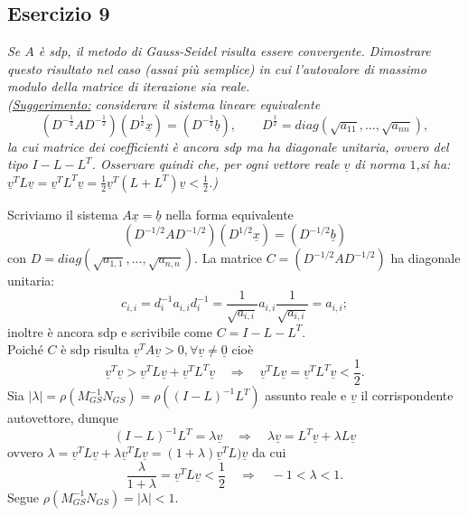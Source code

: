 \subsection{Esercizio 9}
\label{sub:es9}
\emph{Se $A$ è \textit{sdp}, il metodo di Gauss-Seidel risulta essere convergente.
      Dimostrare questo risultato nel caso (assai più semplice) in cui l'autovalore di massimo modulo della matrice di iterazione sia reale.\\
			(\underline{Suggerimento:} considerare il sistema lineare equivalente
			$$(D^{-\frac{1}{2}}AD^{-\frac{1}{2}})(D^{\frac{1}{2}}\underline{x})=(D^{-\frac{1}{2}}\underline{b}),\qquad D^{\frac{1}{2}}=diag(\sqrt{a_{11}},\dots,\sqrt{a_{nn}}),$$
			la cui matrice dei coefficienti è ancora \textit{sdp} ma ha diagonale unitaria,
      ovvero del tipo $I-L-L^T$. Osservare quindi che, per ogni vettore reale $\underline{v}$ di norma $1$,si ha:
      $\underline{v}^TL\underline{v}=\underline{v}^TL^T\underline{v}=\frac{1}{2}\underline{v}^T(L+L^T)\underline{v}<\frac{1}{2}$.)}
\begin{sol}
  Scriviamo il sistema $A\underline{x}=\underline{b}$ nella forma equivalente
  $$\left(D^{-1/2}AD^{-1/2}\right)\left(D^{1/2}\underline{x}\right)=\left(D^{-1/2}\underline{b}\right)$$
  con $D=diag(\sqrt{a_{1,1}},\ldots,\sqrt{a_{n,n}})$.
  La matrice $C=\left(D^{-1/2}AD^{-1/2}\right)$ ha diagonale unitaria:
  $$c_{i,i}=d_i^{-1}a_{i,i}d_i^{-1}=\frac{1}{\sqrt{a_{i,i}}}a_{i,i}\frac{1}{\sqrt{a_{i,i}}}=a_{i,i};$$
  inoltre è ancora sdp e scrivibile come $C=I-L-L^T$.\\
  Poiché $C$ è sdp risulta $\underline{v}^TA\underline{v}>0, \forall\underline{v}\neq\underline{0}$
  cioè $$\underline{v}^T\underline{v}>\underline{v}^TL\underline{v}+\underline{v}^TL^T\underline{v}\quad\Rightarrow\quad\underline{v}^TL\underline{v}=\underline{v}^TL^T\underline{v}<\frac{1}{2}.$$
  Sia $|\lambda|=\rho(M_{GS}^{-1}N_{GS})=\rho\left((I-L)^{-1}L^T\right)$
  assunto reale e $\underline{v}$ il corrispondente autovettore, dunque
  $$(I-L)^{-1}L^T=\lambda\underline{v}\quad\Rightarrow\quad\lambda\underline{v}=L^T\underline{v}+\lambda L\underline{v}$$
  ovvero $\lambda=\underline{v}^TL\underline{v}+\lambda\underline{v}^TL\underline{v}=(1+\lambda)\underline{v}^TL)\underline{v}$
  da cui $$\frac{\lambda}{1+\lambda}=\underline{v}^TL\underline{v}<\frac{1}{2}\quad\Rightarrow\quad -1<\lambda<1.$$
  Segue $\rho(M_{GS}^{-1}N_{GS})=|\lambda|<1$.
\end{sol}

